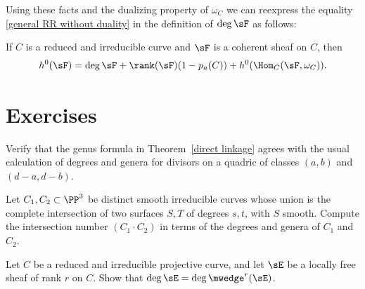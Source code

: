 Using 
these facts and
the dualizing property of $\omega_C$ we can 
reexpress the equality
\eqref{general RR without duality} 
in the definition of $\deg\sF$ as follows:

\begin{theorem}\label{general RR with duality}
If $C$ is a reduced and irreducible curve and $\sF$ is a coherent sheaf
on $C$, then
$$
h^0(\sF) = \deg\sF + \rank(\sF)(1-p_a(C)) + h^0(\Hom_C(\sF, \omega_C)).
$$
\end{theorem}

\section{Exercises}

\begin{exercise}
Verify that the genus formula in Theorem~\ref{direct linkage} agrees with
the usual calculation of degrees and genera for divisors on a quadric of
classes $(a,b)$ and $(d-a, d-b)$.
\end{exercise}

\begin{exercise}
 Let $C_1, C_2\subset \PP^3$ be distinct smooth irreducible curves
whose union is the complete
%
intersection
of two surfaces $S,T$
of degrees $s,t$,
with $S$ smooth.
Compute the intersection number $(C_{1}\cdot C_{2})$
%
in terms of the degrees and genera of $C_{1}$ and $C_{2}$.
\end{exercise}

\begin{exercise}
Let $C$ be a reduced and irreducible projective curve, and let $\sE$
be a locally free sheaf of rank $r$ on $C$. Show that
$\deg \sE = \deg\mwedge^r(\sE)$.
\end{exercise}


